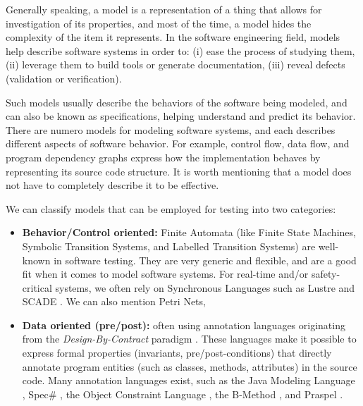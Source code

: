 
Generally speaking, a model is a representation of a thing that
allows for investigation of its properties, and most of the time,
a model hides the complexity of the item it represents. In the
software engineering field, models help describe software systems
in order to: (i) ease the process of studying them, (ii) leverage
them to build tools or generate documentation, (iii) reveal
defects (validation or verification).

Such models usually describe the behaviors of the software being
modeled, and can also be known as specifications, helping
understand and predict its behavior. There are numero models for
modeling software systems, and each describes different aspects
of software behavior. For example, control flow, data flow, and
program dependency graphs express how the implementation behaves
by representing its source code structure. It is worth mentioning
that a model does not have to completely describe it to be
effective.

We can classify models that can be employed for testing into two
categories:

\begin{itemize}
\item \textbf{Behavior/Control oriented:} Finite Automata (like
Finite State Machines, Symbolic Transition Systems, and Labelled
Transition Systems) are well-known in software testing. They are
very generic and flexible, and are a good fit when it comes to
model software systems. For real-time and/or safety-critical
systems, we often rely on Synchronous Languages such as Lustre
\cite{lustre:ieee} and SCADE
\cite{LeSergent:2011:SCF:2188575.2188578}. We can also mention
Petri Nets,

\item \textbf{Data oriented (pre/post):} often using annotation
languages originating from the \textit{Design-By-Contract}
paradigm \cite{Meyer:1992:ADC:618974.619797}. These languages
make it possible to express formal properties (invariants,
pre/post-conditions) that directly annotate program entities
(such as classes, methods, attributes) in the source code. Many
annotation languages exist, such as the Java Modeling Language
\cite{jml}, Spec\# \cite{117852}, the Object Constraint Language
\cite{Warmer:1998:OCL:291202}, the B-Method
\cite{Lano:1996:BLM:525749}, and Praspel
\cite{Enderlin:2011:PSL:2075545.2075551}.
\end{itemize}


